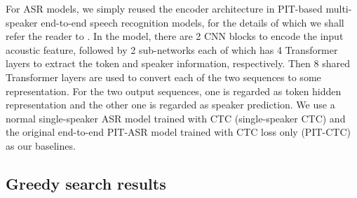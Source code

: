 \documentclass{article}
\begin{document}
For ASR models, we simply reused the encoder architecture in PIT-based multi-speaker end-to-end speech recognition models, for the details of which we shall refer the reader to \cite{chang2019end}.
In the model, there are 2 CNN blocks to encode the input acoustic feature, followed by 2 sub-networks each of which has 4 Transformer layers to extract the token and speaker information, respectively. Then 8 shared Transformer layers are used to convert each of the two sequences to some representation. For the two output sequences, one is regarded as token hidden representation and the other one is regarded as speaker prediction.
We use a normal single-speaker ASR model trained with CTC (single-speaker CTC)
and the original end-to-end PIT-ASR model \cite{chang2019end} trained with CTC loss only (PIT-CTC) as our baselines.

\subsection{Greedy search results}
\label{ssec:exp1}


\begin{table}[t]
    \centering
    \caption{WER(\%) comparison between baselines and the GTC-e model using greedy search decoding.}
    \label{tab:greedy}
    \vspace{-15pt}
\end{table}
\end{document}
